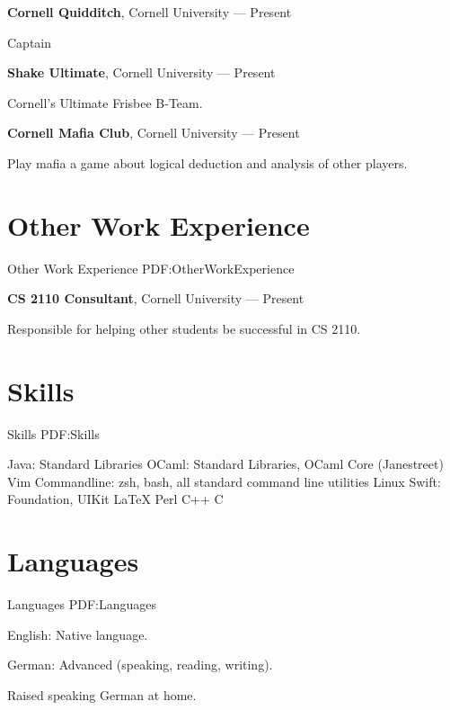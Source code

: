 \documentclass[letterpaper,10pt,oneside]{simpleresumecv}
\begin{document}
\begin{body}
{\textbf{Cornell Quidditch}},
Cornell University
\hfill
{} --- Present

\GapNoBreak%
\BulletItem%
Captain

{\textbf{Shake Ultimate}},
Cornell University
\hfill
{} --- Present

\GapNoBreak%
\BulletItem%
Cornell's Ultimate Frisbee B-Team.

{\textbf{Cornell Mafia Club}},
Cornell University
\hfill
{} --- Present

\GapNoBreak%
\BulletItem%
Play mafia a game about logical deduction and analysis of other players.


\section%
{Other Work\newline
Experience}
{Other Work Experience}
{PDF:OtherWorkExperience}

{\textbf{CS 2110 Consultant}},
Cornell University
\hfill
{} --- Present

\GapNoBreak%
\BulletItem%
Responsible for helping other students be successful in CS 2110.


\section%
{Skills}
{Skills}
{PDF:Skills}

\BulletItem%
Java: Standard Libraries
\BulletItem%
OCaml: Standard Libraries, OCaml Core (Janestreet)
\BulletItem%
Vim
\BulletItem%
Commandline: zsh, bash, all standard command line utilities
\BulletItem%
Linux
\BulletItem%
Swift: Foundation, UIKit
\BulletItem%
{\LaTeX}
\BulletItem%
Perl
\BulletItem%
C++
\BulletItem%
C


\section%
{Languages}
{Languages}
{PDF:Languages}

\BulletItem%
English: Native language.

\GapNoBreak%
\BulletItem%
German: Advanced (speaking, reading, writing).
\begin{detail}
\SubBulletItem%
Raised speaking German at home.
\end{detail}


\end{body}
\end{document}
